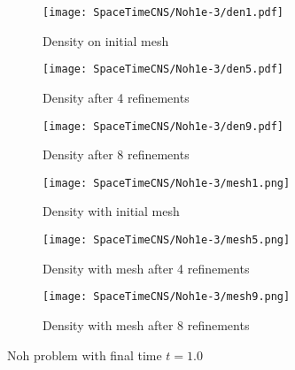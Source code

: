 \documentclass[Proposal.tex]{subfiles}
\begin{document}
\begin{figure}[p]
\centering
\begin{subfigure}[c]{0.3\textwidth}
\centering
\texttt{[image: SpaceTimeCNS/Noh1e-3/den1.pdf]}
\caption{Density on initial mesh}
\label{fig:noh_den0}
\end{subfigure}
\begin{subfigure}[c]{0.3\textwidth}
\centering
\texttt{[image: SpaceTimeCNS/Noh1e-3/den5.pdf]}
\caption{Density after 4 refinements}
\label{fig:noh_den4}
\end{subfigure}
\begin{subfigure}[c]{0.3\textwidth}
\centering
\texttt{[image: SpaceTimeCNS/Noh1e-3/den9.pdf]}
\caption{Density after 8 refinements}
\label{fig:noh_den8}
\end{subfigure}
\begin{subfigure}[c]{0.45\textwidth}
\centering
\texttt{[image: SpaceTimeCNS/Noh1e-3/mesh1.png]}
\caption{Density with initial mesh}
\label{fig:noh_mesh0}
\end{subfigure}
\begin{subfigure}[c]{0.45\textwidth}
\centering
\texttt{[image: SpaceTimeCNS/Noh1e-3/mesh5.png]}
\caption{Density with mesh after 4 refinements}
\label{fig:noh_mesh4}
\end{subfigure}
\begin{subfigure}[c]{0.9\textwidth}
\centering
\texttt{[image: SpaceTimeCNS/Noh1e-3/mesh9.png]}
\caption{Density with mesh after 8 refinements}
\label{fig:noh_mesh8}
\end{subfigure}
\caption{Noh problem with final time $t=1.0$}
\label{fig:noh}
\end{figure}
\end{document}
